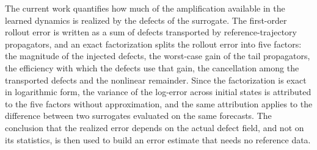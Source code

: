 The current work quantifies how much of the amplification available in the learned dynamics is realized by the defects of the surrogate. The first-order rollout error is written as a sum of defects transported by reference-trajectory propagators, and an exact factorization splits the rollout error into five factors: the magnitude of the injected defects, the worst-case gain of the tail propagators, the efficiency with which the defects use that gain, the cancellation among the transported defects and the nonlinear remainder. Since the factorization is exact in logarithmic form, the variance of the log-error across initial states is attributed to the five factors without approximation, and the same attribution applies to the difference between two surrogates evaluated on the same forecasts. The conclusion that the realized error depends on the actual defect field, and not on its statistics, is then used to build an error estimate that needs no reference data.

